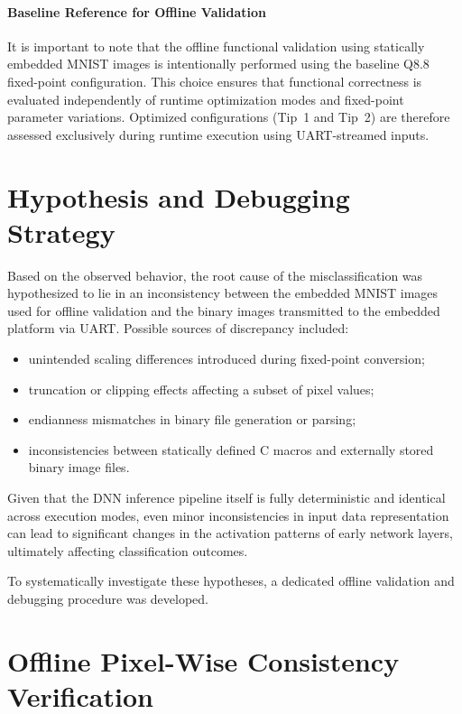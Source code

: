\paragraph{Baseline Reference for Offline Validation}
It is important to note that the offline functional validation using statically
embedded MNIST images is intentionally performed using the baseline Q8.8 fixed-point
configuration.
This choice ensures that functional correctness is evaluated independently of
runtime optimization modes and fixed-point parameter variations.
Optimized configurations (Tip~1 and Tip~2) are therefore assessed exclusively
during runtime execution using UART-streamed inputs.


\section{Hypothesis and Debugging Strategy}

Based on the observed behavior, the root cause of the misclassification was
hypothesized to lie in an inconsistency between the embedded MNIST images used for
offline validation and the binary images transmitted to the embedded platform via
UART.
Possible sources of discrepancy included:
\begin{itemize}
    \item unintended scaling differences introduced during fixed-point conversion;
    \item truncation or clipping effects affecting a subset of pixel values;
    \item endianness mismatches in binary file generation or parsing;
    \item inconsistencies between statically defined C macros and externally stored
          binary image files.
\end{itemize}

Given that the DNN inference pipeline itself is fully deterministic and identical
across execution modes, even minor inconsistencies in input data representation
can lead to significant changes in the activation patterns of early network layers,
ultimately affecting classification outcomes.

To systematically investigate these hypotheses, a dedicated offline validation and
debugging procedure was developed.

\section{Offline Pixel-Wise Consistency Verification}

